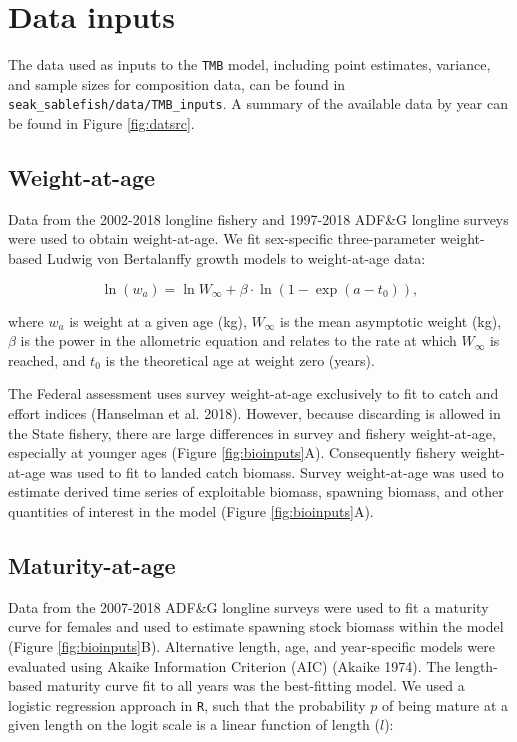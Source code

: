 \documentclass[]{article}
\begin{document}
\section{Data inputs}\label{data-inputs}

The data used as inputs to the \texttt{TMB} model, including point
estimates, variance, and sample sizes for composition data, can be found
in \texttt{seak\_sablefish/data/TMB\_inputs}. A summary of the available
data by year can be found in Figure \ref{fig:datsrc}.

\subsection{Weight-at-age}\label{weight-at-age}

Data from the 2002-2018 longline fishery and 1997-2018 ADF\&G longline
surveys were used to obtain weight-at-age. We fit sex-specific
three-parameter weight-based Ludwig von Bertalanffy growth models to
weight-at-age data:

\begin{equation}
\ln(w_a)=\ln W_{\infty}+\beta \cdot \ln (1-\exp (a-t_0)) ,
\label{eq:weightvonb}
\end{equation}

where \(w_a\) is weight at a given age (kg), \(W_{\infty}\) is the mean
asymptotic weight (kg), \(\beta\) is the power in the allometric
equation and relates to the rate at which \(W_{\infty}\) is reached, and
\(t_0\) is the theoretical age at weight zero (years).

The Federal assessment uses survey weight-at-age exclusively to fit to
catch and effort indices (Hanselman et al. 2018). However, because
discarding is allowed in the State fishery, there are large differences
in survey and fishery weight-at-age, especially at younger ages (Figure
\ref{fig:bioinputs}A). Consequently fishery weight-at-age was used to
fit to landed catch biomass. Survey weight-at-age was used to estimate
derived time series of exploitable biomass, spawning biomass, and other
quantities of interest in the model (Figure \ref{fig:bioinputs}A).

\subsection{Maturity-at-age}\label{maturity-at-age}

Data from the 2007-2018 ADF\&G longline surveys were used to fit a
maturity curve for females and used to estimate spawning stock biomass
within the model (Figure \ref{fig:bioinputs}B). Alternative length, age,
and year-specific models were evaluated using Akaike Information
Criterion (AIC) (Akaike 1974). The length-based maturity curve fit to
all years was the best-fitting model. We used a logistic regression
approach in \texttt{R}, such that the probability \(p\) of being mature
at a given length on the logit scale is a linear function of length
(\(l\)):
\end{document}
